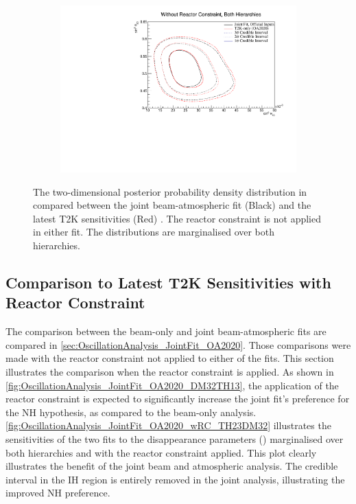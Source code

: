 \begin{figure}[h]
  \begin{subfigure}[t]{0.98\textwidth}
    \includegraphics[width=\textwidth, trim={0mm 0mm 0mm 0mm}, clip,page=1]{Figures/OA/JointFit_OA2020_Comp/ContourComparison_2D_th13_th23_BH_1_woRC_UnSmeared_CredibleInterval.pdf}
  \end{subfigure}
  \caption{The two-dimensional posterior probability density distribution in  compared between the joint beam-atmospheric fit (Black) and the latest T2K sensitivities (Red) \cite{t2k_tn_399}. The reactor constraint is not applied in either fit. The distributions are marginalised over both hierarchies.}
  \label{fig:OscillationAnalysis_JointFit_OA2020_TH13TH23}
\end{figure}

\clearpage
\subsection{Comparison to Latest T2K Sensitivities with Reactor Constraint}
\label{sec:OscillationAnalysis_JointFit_OA2020_wRC}
The comparison between the beam-only and joint beam-atmospheric fits are compared in \autoref{sec:OscillationAnalysis_JointFit_OA2020}. Those comparisons were made with the reactor constraint not applied to either of the fits. This section illustrates the comparison when the reactor constraint is applied. As shown in \autoref{fig:OscillationAnalysis_JointFit_OA2020_DM32TH13}, the application of the reactor constraint is expected to significantly increase the joint fit's preference for the NH hypothesis, as compared to the beam-only analysis. \autoref{fig:OscillationAnalysis_JointFit_OA2020_wRC_TH23DM32} illustrates the sensitivities of the two fits to the disappearance parameters () marginalised over both hierarchies and with the reactor constraint applied. This plot clearly illustrates the benefit of the joint beam and atmospheric analysis. The \quickmath{1\sigma} credible interval in the IH region is entirely removed in the joint analysis, illustrating the improved NH preference.

